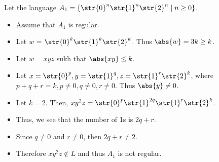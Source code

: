 Let the language $A_1 = \{\str{0}^n\str{1}^n\str{2}^n \mid n \geq 0\}$.
\begin{itemize}
	\item Assume that $A_1$ is regular.
	\item Let $w$ = $\str{0}^k\str{1}^k\str{2}^k$. Thus $\abs{w} = 3k \geq k$.
	\item Let $w = xyz$ sukh that $\abs{xy} \leq k$.
	\item Let $x = \str{0}^p, y = \str{1}^q, z = \str{1}^r\str{2}^k$, where $p+q+r = k, p \neq 0, q \neq 0, r \neq 0$. Thus $\abs{y} \neq 0$.
	\item Let $k=2$. Then, $xy^2z = \str{0}^p\str{1}^{2q}\str{1}^r\str{2}^k$.
	\item Thus, we see that the number of 1s is $2q + r$.
	\item Since $q \neq 0$ and $r \neq 0$, then $2q + r \neq 2$.
	\item Therefore $xy^2z \notin L$ and thus $A_1$ is not regular.
\end{itemize}
